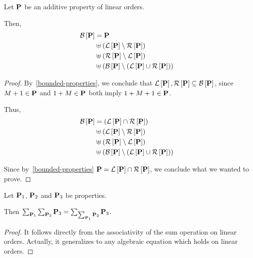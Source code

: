 \begin{lemma}
  Let $\pp$ be an additive property of linear orders.

  Then,
  \[
    \begin{aligned}
      \bounded{\pp} & = \pp                                                            \\
                    & \uplus \ps{\lb{\pp} \setminus \rb{\pp}}                          \\
                    & \uplus \ps{\rb{\pp} \setminus \lb{\pp}}                          \\
                    & \uplus \ps{ \bounded{\pp} \setminus \ps{\lb{\pp} \cup \rb{\pp}}}
    \end{aligned}
  \]
\end{lemma}

\begin{proof}
  By~\cref{bounded-properties}, we conclude that
  $\lb{\pp}, \rb{\pp} \subseteq \bounded{\pp}$,
  since $M + 1 \in \pp$ and $1 + M \in \pp$ both imply $1 + M + 1 \in \pp$.

  Thus,
  \[
    \begin{aligned}
      \bounded{\pp} & = \ps{\lb{\pp} \cap \rb{\pp}}                                                      \\
                    & \uplus \ps{\lb{\pp} \setminus \rb{\pp}}                          \\
                    & \uplus \ps{\rb{\pp} \setminus \lb{\pp}}                          \\
                    & \uplus \ps{ \bounded{\pp} \setminus \ps{\lb{\pp} \cup \rb{\pp}}}
    \end{aligned}
  \]

  Since by~\cref{bounded-properties} $\pp = \lb{\pp} \cap \rb{\pp}$,
  we conclude what we wanted to prove.
\end{proof}

\begin{lemma}
  Let $\pp_1$, $\pp_2$ and $\pp_3$ be properties.

  Then $\sum_{\pp_1}{\sum_{\pp_2}{\pp_3}} = \sum_{\sum_{\pp_1}{\pp_2}}{\pp_3}$.
\end{lemma}

\begin{proof}
  It follows directly from the associativity of the sum operation on
  linear orders. Actually, it generalizes to any algebraic equation
  which holds on linear orders.
\end{proof}

